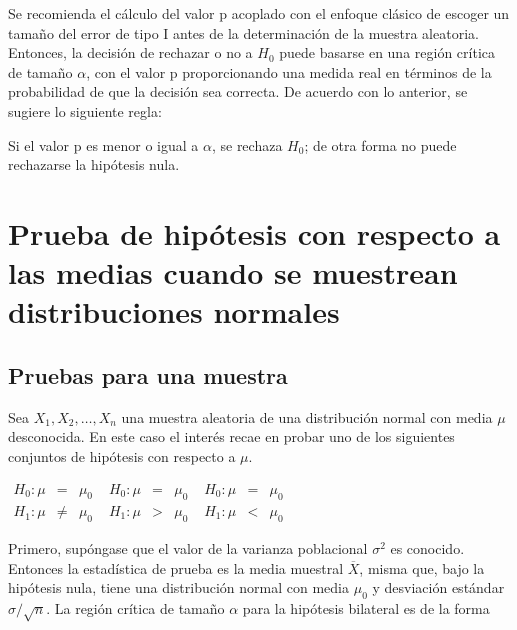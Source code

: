 Se recomienda el cálculo del valor p acoplado con el enfoque clásico de escoger un tamaño del error de tipo I antes de la determinación de la muestra aleatoria. Entonces, la decisión de rechazar o no a $H_0$ puede basarse en una región crítica de tamaño $\alpha$, con el valor p proporcionando una medida real en términos de la probabilidad de que la decisión sea correcta. De acuerdo con lo anterior, se sugiere lo siguiente regla:

\begin{tcolorbox}
    Si el valor p es menor o igual a $\alpha$, se rechaza $H_0$; de otra forma no puede rechazarse la hipótesis nula.
\end{tcolorbox}

\section{Prueba de hipótesis con respecto a las medias cuando se muestrean distribuciones normales}

\subsection{Pruebas para una muestra}
Sea $X_1,X_2,\ldots,X_n$ una muestra aleatoria de una distribución normal con media $\mu$ desconocida. En este caso el interés recae en probar uno de los siguientes conjuntos de hipótesis con respecto a $\mu$.
\begin{center}
    $
    \begin{array}{rcl}
	H_0: \mu & = & \mu_0\\
	H_1: \mu & \neq & \mu_0
    \end{array}
    $
    \quad 
    $
    \begin{array}{rcl}
	H_0: \mu & = & \mu_0\\
	H_1: \mu & > & \mu_0
    \end{array}
    $
    \quad 
    $
    \begin{array}{rcl}
	H_0: \mu & = & \mu_0\\
	H_1: \mu & < & \mu_0
    \end{array}
    $
\end{center}

Primero, supóngase que el valor de la varianza poblacional $\sigma^2$ es conocido. Entonces la estadística de prueba es la media muestral $\overline{X}$, misma que, bajo la hipótesis nula, tiene una distribución normal con media $\mu_0$ y desviación estándar $\sigma/\sqrt{n}$. La región crítica de tamaño $\alpha$ para la hipótesis bilateral es de la forma

